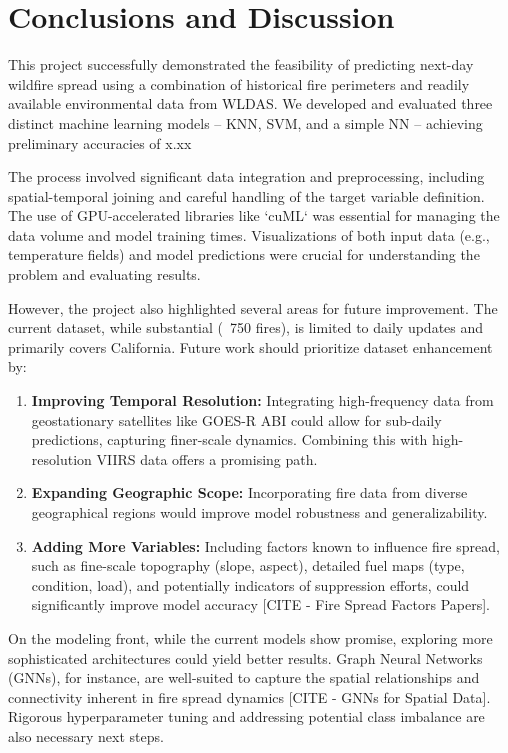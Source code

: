 \documentclass[conference]{IEEEtran}
\begin{document}
\section{Conclusions and Discussion}
This project successfully demonstrated the feasibility of predicting next-day wildfire spread using a combination of historical fire perimeters and readily available environmental data from WLDAS. We developed and evaluated three distinct machine learning models – KNN, SVM, and a simple NN – achieving preliminary accuracies of x.xx%

The process involved significant data integration and preprocessing, including spatial-temporal joining and careful handling of the target variable definition. The use of GPU-accelerated libraries like `cuML` was essential for managing the data volume and model training times. Visualizations of both input data (e.g., temperature fields) and model predictions were crucial for understanding the problem and evaluating results.

However, the project also highlighted several areas for future improvement. The current dataset, while substantial (~750 fires), is limited to daily updates and primarily covers California. Future work should prioritize dataset enhancement by:
\begin{enumerate}
    \item \textbf{Improving Temporal Resolution:} Integrating high-frequency data from geostationary satellites like GOES-R ABI could allow for sub-daily predictions, capturing finer-scale dynamics. Combining this with high-resolution VIIRS data offers a promising path.
    \item \textbf{Expanding Geographic Scope:} Incorporating fire data from diverse geographical regions would improve model robustness and generalizability.
    \item \textbf{Adding More Variables:} Including factors known to influence fire spread, such as fine-scale topography (slope, aspect), detailed fuel maps (type, condition, load), and potentially indicators of suppression efforts, could significantly improve model accuracy [CITE - Fire Spread Factors Papers].
\end{enumerate}

On the modeling front, while the current models show promise, exploring more sophisticated architectures could yield better results. Graph Neural Networks (GNNs), for instance, are well-suited to capture the spatial relationships and connectivity inherent in fire spread dynamics [CITE - GNNs for Spatial Data]. Rigorous hyperparameter tuning and addressing potential class imbalance are also necessary next steps.
\end{document}
